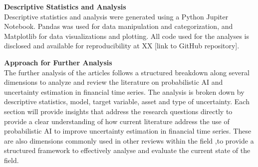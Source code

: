 \textbf{Descriptive Statistics and Analysis}\\
Descriptive statistics and analysis were generated using a Python Jupiter Notebook. Pandas was used for data manipulation and categorization, and Matplotlib for data visualizations and plotting. All code used for the analyses is disclosed and available for reproducibility at XX [link to GitHub repository]. 

\textbf{Approach for Further Analysis}\\
The further analysis of the articles follows a structured breakdown along several dimensions to analyze and review the literature on probabilistic AI and uncertainty estimation in financial time series. The analysis is broken down by descriptive statistics, model, target variable, asset and type of uncertainty. Each section will provide insights that address the research questions directly to provide a clear understanding of how current literature address the use of probabilistic AI to improve uncertainty estimation in financial time series. These are also dimensions commonly used in other reviews within the field \parencite{Blasco_et_al_2024},to provide a structured framework to effectively analyse and evaluate the current state of the field. 

